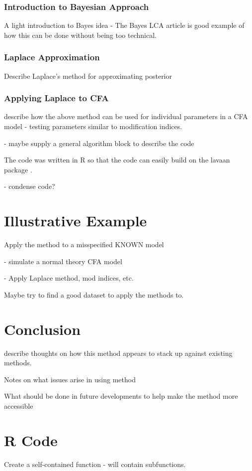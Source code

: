 \documentclass[man, noextraspace, floatsintext, 12pt]{apa7}
\begin{document}
\subsubsection{Introduction to Bayesian Approach}

A light introduction to Bayes idea - The Bayes LCA article is good example of how this can be done without being too technical.

 
\subsubsection{Laplace Approximation}

Describe Laplace's method for approximating posterior

\subsubsection{Applying Laplace to CFA}

describe how the above method can be used for individual parameters in a CFA model - testing parameters similar to modification indices.

- maybe supply a general algorithm block to describe the code

The code was written in R \citep{R2020} so that the code can easily build on the lavaan package \citep{lavaan2012}.

- condense code?

\section{Illustrative Example}

Apply the method to a misspecified KNOWN model

- simulate a normal theory CFA model

- Apply Laplace method, mod indices, etc.


Maybe try to find a good dataset to apply the methods to.

\section{Conclusion}

describe thoughts on how this method appears to stack up against existing methods.

Notes on what issues arise in using method

What should be done in future developments to help make the method more accessible


\newpage
\raggedright
% 
%
\printbibliography
\appendix

\section{R Code}

Create a self-contained function - will contain subfunctions.
\end{document}
